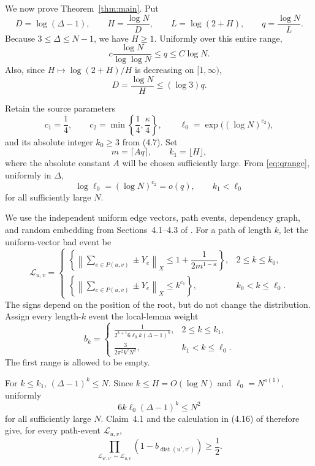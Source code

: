 \documentclass[11pt]{article}
\newcommand{\dist}{\operatorname{dist}}
\begin{document}
We now prove Theorem~\ref{thm:main}. Put
\[
 D=\log(\Delta-1),\qquad
 H=\frac{\log N}{D},\qquad
 L=\log(2+H),\qquad
 q=\frac{\log N}{L}.
\]
Because $3\leq\Delta\leq N-1$, we have $H\geq1$. Uniformly over this entire
range,
\begin{equation}\label{eq:qrange}
 c\frac{\log N}{\log\log N}\leq q\leq C\log N.
\end{equation}
Also, since $H\mapsto\log(2+H)/H$ is decreasing on $[1,\infty)$,
\begin{equation}\label{eq:Dq}
 D=\frac{\log N}{H}\leq(\log3)q.
\end{equation}

Retain the source parameters
\[
 c_1=\frac14,
 \qquad
 c_2=\min\left\{\frac14,\frac\kappa4\right\},
 \qquad
 \ell_0=\exp\bigl((\log N)^{c_2}\bigr),
\]
and its absolute integer $k_0\geq3$ from (4.7). Set
\[
 m=\lceil Aq\rceil,
 \qquad
 k_1=\lfloor H\rfloor,
\]
where the absolute constant $A$ will be chosen sufficiently large. From
\eqref{eq:qrange}, uniformly in $\Delta$,
\begin{equation}\label{eq:small}
 \log\ell_0=(\log N)^{c_2}=o(q),
 \qquad
 k_1<\ell_0
\end{equation}
for all sufficiently large $N$.

We use the independent uniform edge vectors, path events, dependency graph,
and random embedding from Sections~4.1--4.3 of \cite{ADTT}. For a path of
length $k$, let the uniform-vector bad event be
\[
 \mathcal L_{u,v}=
 \begin{cases}
 \left\{\left\|\sum_{e\in P(u,v)}\!\!\pm Y_e\right\|_X
 \leq1+\dfrac{1}{2m^{1-\kappa}}\right\},&2\leq k\leq k_0,\\[8pt]
 \left\{\left\|\sum_{e\in P(u,v)}\!\!\pm Y_e\right\|_X
 \leq k^{c_1}\right\},&k_0<k\leq\ell_0.
 \end{cases}
\]
The signs depend on the position of the root, but do not change the
distribution. Assign every length-$k$ event the local-lemma weight
\begin{equation}\label{eq:bk}
 b_k=
 \begin{cases}
 \displaystyle\frac{1}{2^{k+1}6\ell_0k(\Delta-1)^k},
 &2\leq k\leq k_1,\\[7pt]
 \displaystyle\frac{3}{2\pi^2k^2N^2},
 &k_1<k\leq\ell_0.
 \end{cases}
\end{equation}
The first range is allowed to be empty.

For $k\leq k_1$, $(\Delta-1)^k\leq N$. Since
$k\leq H=O(\log N)$ and $\ell_0=N^{o(1)}$, uniformly
\begin{equation}\label{eq:dependency}
 6k\ell_0(\Delta-1)^k\leq N^2
\end{equation}
for all sufficiently large $N$. Claim~4.1 and the calculation in (4.16) of
\cite{ADTT} therefore give, for every path-event $\mathcal L_{u,v}$,
\begin{equation}\label{eq:product}
 \prod_{\mathcal L_{u',v'}\sim\mathcal L_{u,v}}
 (1-b_{\dist(u',v')})\geq\frac12.
\end{equation}
\end{document}
